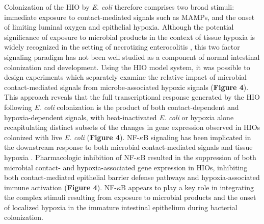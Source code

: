 \documentclass[9pt,lineo]{elife}
\begin{document}
Colonization of the HIO by \emph{E. coli} therefore comprises two broad stimuli: immediate exposure to contact-mediated signals such as MAMPs, and the onset of limiting luminal oxygen and epithelial hypoxia. Although the potential significance of exposure to microbial products in the context of tissue hypoxia is widely recognized in the setting of necrotizing enterocolitis \citep{Tanner:2015,Afrazi:2014,Hackam:2013,Neu:2011,Upperman:2005,Nanthakumar:2011}, this two factor signaling paradigm has not been well studied as a component of normal intestinal colonization and development. Using the HIO model system, it was possible to design experiments which separately examine the relative impact of microbial contact-mediated signals from microbe-associated hypoxic signals (\textbf{Figure 4}). This approach reveals that the full transcriptional response generated by the HIO following \emph{E. coli} colonization is the product of both contact-dependent and hypoxia-dependent signals, with heat-inactivated \emph{E. coli} or hypoxia alone recapitulating distinct subsets of the changes in gene expression observed in HIOs colonized with live \emph{E. coli} (\textbf{Figure 4}). NF-\(\kappa\)B signaling has been implicated in the downstream response to both microbial contact-mediated signals \citep{Zhang:2001,Xiao:2005,Kawai:2007} and tissue hypoxia \citep{Rius:2008,Arias-Loste:2015,Oliver:2009,Zeitouni:2016,Colgan:2013,Grenz:2012}. Pharmacologic inhibition of NF-\(\kappa\)B resulted in the suppression of both microbial contact- and hypoxia-associated gene expression in HIOs, inhibiting both contact-mediated epithelial barrier defense pathways and hypoxia-associated immune activation (\textbf{Figure 4}). NF-\(\kappa\)B appears to play a key role in integrating the complex stimuli resulting from exposure to microbial products and the onset of localized hypoxia in the immature intestinal epithelium during bacterial colonization.
\end{document}
